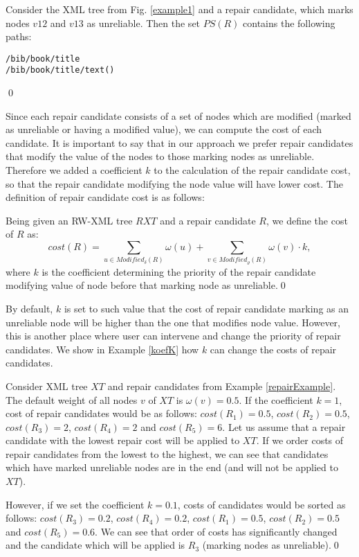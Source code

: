 \begin{example}\label{PSExample}
Consider the XML tree from Fig. \ref{example1} and a repair candidate, which marks nodes $v12$ and $v13$ as unreliable. Then the set $PS(R)$ contains the following paths:
\begin{verbatim}
/bib/book/title
/bib/book/title/text()
\end{verbatim}\qed
\end{example}


Since each repair candidate consists of a set of nodes which are modified (marked as unreliable or having a modified value), we can compute the cost of each candidate. It is important to say that in our approach we prefer repair candidates that modify the value of the nodes to those marking nodes as unreliable. Therefore we added a coefficient $k$ to the calculation of the repair candidate cost, so that the repair candidate modifying the node value will have lower cost. The definition of repair candidate cost is as follows:

\begin{define}
Being given an RW-XML tree $RXT$ and a repair candidate $R$, we define the cost of $R$ as:
$$cost(R) = \sum_{u \in Modified_\delta(R)} \omega(u) + \sum_{v \in Modified_\varrho(R)} \omega(v) \cdot k,$$
where $k$ is the coefficient determining the priority of the repair candidate modifying value of node before that  marking node as unreliable.\qed
\end{define}

By default, $k$ is set to such value that the cost of repair candidate marking as an unreliable node will be higher than the one that modifies node value. However, this is another place where user can intervene and change the priority of repair candidates. We show in Example \ref{koefK} how $k$ can change the costs of repair candidates.

\begin{example}\label{koefK}
Consider XML tree $XT$ and repair candidates from Example \ref{repairExample}. The default weight of all nodes $v$ of $XT$ is $\omega(v) = 0.5$. If the coefficient $k = 1$, cost of repair candidates would be as follows: $cost(R_1) = 0.5$, $cost(R_2) = 0.5$, $cost(R_3) = 2$, $cost(R_4) = 2$ and $cost(R_5) = 6$.
Let us assume that a repair candidate with the lowest repair cost will be applied to $XT$. If we order costs of repair candidates from the lowest to the highest, we can see that candidates which have marked unreliable nodes are in the end (and will not be applied to $XT$).

However, if we set the coefficient $k = 0.1$, costs of candidates would be sorted as follows: $cost(R_3) = 0.2$, $cost(R_4) = 0.2$, $cost(R_1) = 0.5$, $cost(R_2)  = 0.5$ and $cost(R_5) = 0.6$. We can see that order of costs has significantly changed and the candidate which will be applied is $R_3$ (marking nodes as unreliable).\qed
\end{example}

